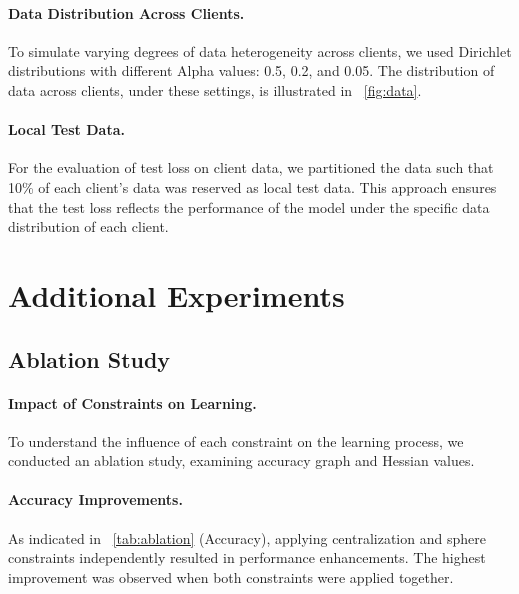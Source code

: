 \documentclass{article}
\theoremstyle{plain}
\theoremstyle{definition}
\theoremstyle{remark}
\begin{document}
\paragraph{Data Distribution Across Clients.}
To simulate varying degrees of data heterogeneity across clients, we used Dirichlet distributions with different Alpha values: 0.5, 0.2, and 0.05. The distribution of data across clients, under these settings, is illustrated in ~\cref{fig:data}.

\paragraph{Local Test Data.}
For the evaluation of test loss on client data, we partitioned the data such that 10\% of each client's data was reserved as local test data. This approach ensures that the test loss reflects the performance of the model under the specific data distribution of each client.


\section{Additional Experiments}

\subsection{Ablation Study}

\paragraph{Impact of Constraints on Learning.}
To understand the influence of each constraint on the learning process, we conducted an ablation study, examining accuracy graph and Hessian values.

\paragraph{Accuracy Improvements.}

As indicated in ~\cref{tab:ablation} (Accuracy), applying centralization and sphere constraints independently resulted in performance enhancements. The highest improvement was observed when both constraints were applied together. 
\end{document}

